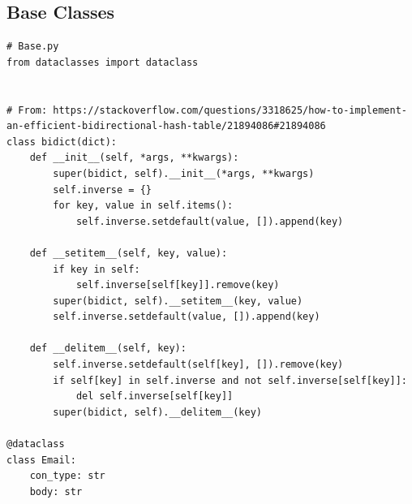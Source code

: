 \documentclass[10pt,a4paper]{article}
\begin{document}
\subsection{Base Classes}
\begin{lstlisting}
# Base.py
from dataclasses import dataclass


# From: https://stackoverflow.com/questions/3318625/how-to-implement-an-efficient-bidirectional-hash-table/21894086#21894086
class bidict(dict):
    def __init__(self, *args, **kwargs):
        super(bidict, self).__init__(*args, **kwargs)
        self.inverse = {}
        for key, value in self.items():
            self.inverse.setdefault(value, []).append(key)
    
    def __setitem__(self, key, value):
        if key in self:
            self.inverse[self[key]].remove(key)
        super(bidict, self).__setitem__(key, value)
        self.inverse.setdefault(value, []).append(key)
    
    def __delitem__(self, key):
        self.inverse.setdefault(self[key], []).remove(key)
        if self[key] in self.inverse and not self.inverse[self[key]]:
            del self.inverse[self[key]]
        super(bidict, self).__delitem__(key)

@dataclass
class Email:
    con_type: str
    body: str

\end{lstlisting}
\end{document}
